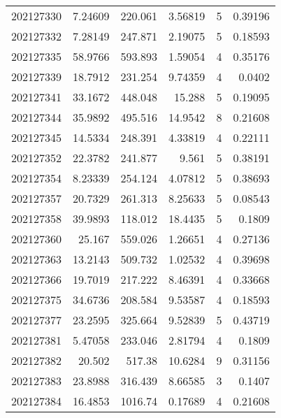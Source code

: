 \begin{tabular}{rrrrrr}
 202127330 &          7.24609 &      220.061  &            3.56819 &           5 & 0.39196 \\
 202127332 &          7.28149 &      247.871  &            2.19075 &           5 & 0.18593 \\
 202127335 &         58.9766  &      593.893  &            1.59054 &           4 & 0.35176 \\
 202127339 &         18.7912  &      231.254  &            9.74359 &           4 & 0.0402  \\
 202127341 &         33.1672  &      448.048  &           15.288   &           5 & 0.19095 \\
 202127344 &         35.9892  &      495.516  &           14.9542  &           8 & 0.21608 \\
 202127345 &         14.5334  &      248.391  &            4.33819 &           4 & 0.22111 \\
 202127352 &         22.3782  &      241.877  &            9.561   &           5 & 0.38191 \\
 202127354 &          8.23339 &      254.124  &            4.07812 &           5 & 0.38693 \\
 202127357 &         20.7329  &      261.313  &            8.25633 &           5 & 0.08543 \\
 202127358 &         39.9893  &      118.012  &           18.4435  &           5 & 0.1809  \\
 202127360 &         25.167   &      559.026  &            1.26651 &           4 & 0.27136 \\
 202127363 &         13.2143  &      509.732  &            1.02532 &           4 & 0.39698 \\
 202127366 &         19.7019  &      217.222  &            8.46391 &           4 & 0.33668 \\
 202127375 &         34.6736  &      208.584  &            9.53587 &           4 & 0.18593 \\
 202127377 &         23.2595  &      325.664  &            9.52839 &           5 & 0.43719 \\
 202127381 &          5.47058 &      233.046  &            2.81794 &           4 & 0.1809  \\
 202127382 &         20.502   &      517.38   &           10.6284  &           9 & 0.31156 \\
 202127383 &         23.8988  &      316.439  &            8.66585 &           3 & 0.1407  \\
 202127384 &         16.4853  &     1016.74   &            0.17689 &           4 & 0.21608 \\

\end{tabular}
